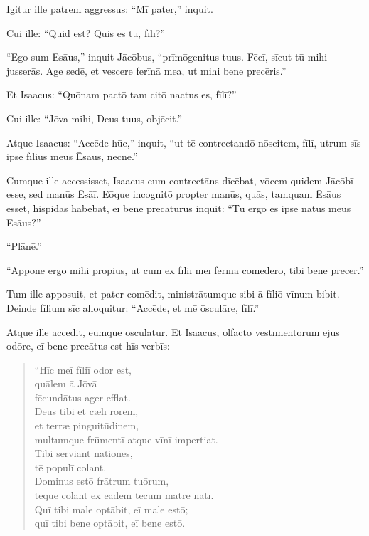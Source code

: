 \Versus Igitur ille patrem aggressus: ``Mī pater,'' inquit.

Cui ille: ``Quid est? Quis es tū, fīlī?''

\Versus ``Ego sum Ēsāus,'' inquit Jācōbus, ``prīmōgenitus tuus. Fēcī, sīcut tū mihi jusserās. Age sedē, et vescere ferīnā mea, ut mihi bene precēris.''

\Versus Et Isaacus: ``Quōnam pactō tam citō nactus es, fīlī?''

Cui ille: ``Jōva mihi, Deus tuus, objēcit.''

\Versus Atque Isaacus: ``Accēde hūc,'' inquit, ``ut tē contrectandō nōscitem, fīlī, utrum sīs ipse fīlius meus Ēsāus, necne.''

\Versus Cumque ille accessisset, Isaacus eum contrectāns dīcēbat, vōcem quidem Jācōbī esse, sed manūs Ēsāī.
\Versus Eōque incognitō propter manūs, quās, tamquam Ēsāus esset, hispidās habēbat, eī bene precātūrus inquit:
\Versus ``Tū ergō es ipse nātus meus Ēsāus?''

``Plānē.''

\Versus ``Appōne ergō mihi propius, ut cum ex fīliī meī ferīnā comēderō, tibi bene precer.''

Tum ille apposuit, et pater comēdit, ministrātumque sibi ā fīliō vīnum bibit.
\Versus Deinde fīlium sīc alloquitur: ``Accēde, et mē ōsculāre, fīlī.''

\Versus Atque ille accēdit, eumque ōsculātur. Et Isaacus, olfactō vestīmentōrum ejus odōre, eī bene precātus est hīs verbīs:

\begin{verse}
\begin{patverse*}
``Hīc meī fīliī odor est,\\
 quālem ā Jōvā\\
 fēcundātus ager efflat.\\
\Versus Deus tibi et cælī rōrem,\\
 et terræ pinguitūdinem,\\
 multumque frūmentī atque vīnī impertiat.\\
\Versus Tibi serviant nātiōnēs,\\
 tē populī colant.\\
 Dominus estō frātrum tuōrum,\\
 tēque colant ex eādem tēcum mātre nātī.\\
 Quī tibi male optābit, eī male estō;\\
 quī tibi bene optābit, eī bene estō.
\end{patverse*}
\end{verse}

